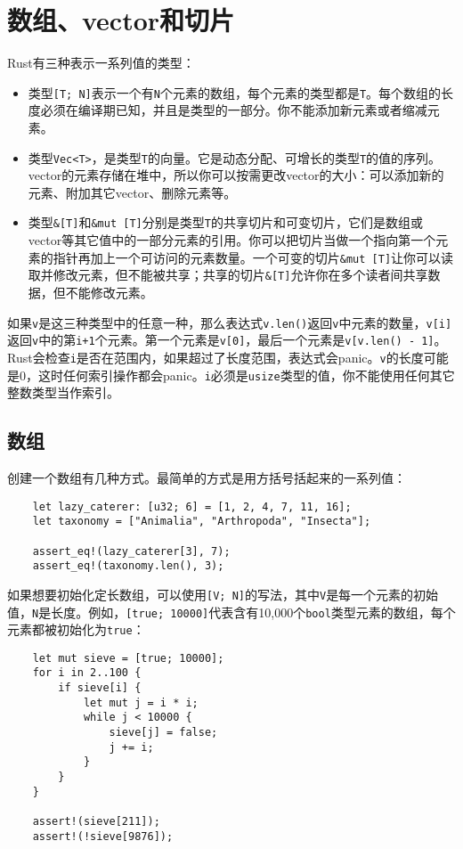 \section{数组、vector和切片}
Rust有三种表示一系列值的类型：
\begin{itemize}
    \item 类型\texttt{[T; N]}表示一个有\texttt{N}个元素的数组，每个元素的类型都是\texttt{T}。每个数组的长度必须在编译期已知，并且是类型的一部分。你不能添加新元素或者缩减元素。
    \item 类型\texttt{Vec<T>}，是类型\texttt{T}的向量。它是动态分配、可增长的类型\texttt{T}的值的序列。vector的元素存储在堆中，所以你可以按需更改vector的大小：可以添加新的元素、附加其它vector、删除元素等。
    \item 类型\texttt{\&[T]}和\texttt{\&mut [T]}分别是类型\texttt{T}的共享切片和可变切片，它们是数组或vector等其它值中的一部分元素的引用。你可以把切片当做一个指向第一个元素的指针再加上一个可访问的元素数量。一个可变的切片\texttt{\&mut [T]}让你可以读取并修改元素，但不能被共享；共享的切片\texttt{\&[T]}允许你在多个读者间共享数据，但不能修改元素。
\end{itemize}

如果\texttt{v}是这三种类型中的任意一种，那么表达式\texttt{v.len()}返回\texttt{v}中元素的数量，\texttt{v[i]}返回\texttt{v}中的第\texttt{i+1}个元素。第一个元素是\texttt{v[0]}，最后一个元素是\texttt{v[v.len() - 1]}。Rust会检查\texttt{i}是否在范围内，如果超过了长度范围，表达式会panic。\texttt{v}的长度可能是0，这时任何索引操作都会panic。\texttt{i}必须是\texttt{usize}类型的值，你不能使用任何其它整数类型当作索引。

\subsection{数组}
创建一个数组有几种方式。最简单的方式是用方括号括起来的一系列值：
\begin{verbatim}
    let lazy_caterer: [u32; 6] = [1, 2, 4, 7, 11, 16];
    let taxonomy = ["Animalia", "Arthropoda", "Insecta"];

    assert_eq!(lazy_caterer[3], 7);
    assert_eq!(taxonomy.len(), 3);
\end{verbatim}

如果想要初始化定长数组，可以使用\texttt{[V; N]}的写法，其中\texttt{V}是每一个元素的初始值，\texttt{N}是长度。例如，\texttt{[true; 10000]}代表含有10,000个\texttt{bool}类型元素的数组，每个元素都被初始化为\texttt{true}：
\begin{verbatim}
    let mut sieve = [true; 10000];
    for i in 2..100 {
        if sieve[i] {
            let mut j = i * i;
            while j < 10000 {
                sieve[j] = false;
                j += i;
            }
        }
    }

    assert!(sieve[211]);
    assert!(!sieve[9876]);
\end{verbatim}

